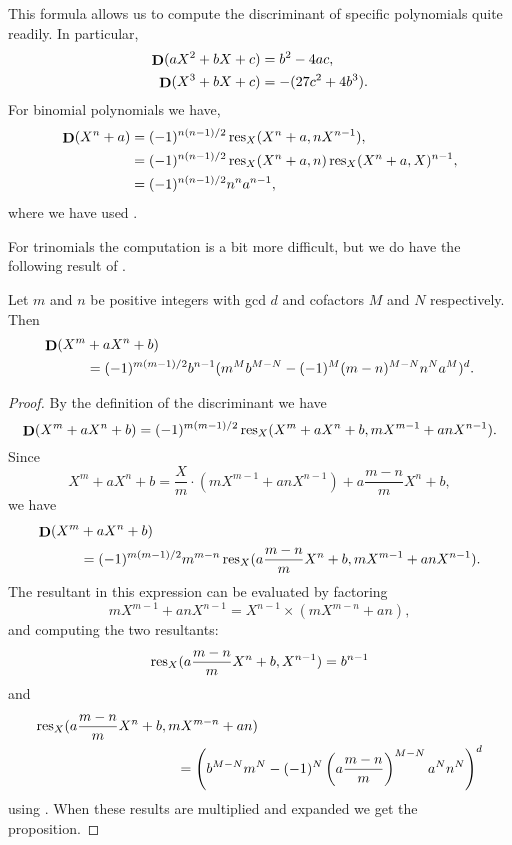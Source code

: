 This formula allows us to compute the discriminant of specific
polynomials quite readily.  In particular,
\[
\begin{aligned}
\mathop{\mathbf{D}}\nolimits(aX^2 + bX + c) & = b^2 - 4ac, \\
\mathop{\mathbf{D}}\nolimits(X^3 + bX + c)  & = -(27 c^2 + 4b^3).
\end{aligned}
\]
For binomial polynomials we have,
\[
\begin{aligned}
\mathop{\mathbf{D}}\nolimits(X^n +a) &= (-1)^{n(n-1)/2} \mathop{\rm res}\nolimits_X(X^n + a, n X^{n-1}), \\
 & = (-1)^{n(n-1)/2} \mathop{\rm res}\nolimits_X(X^n + a, n) \mathop{\rm res}\nolimits_X(X^n + a, X)^{n-1}, \\
 & = (-1)^{n(n-1)/2} n^n a^{n-1},
\end{aligned}
\]
where we have used .

For trinomials the computation is a bit more difficult, but we do have
the following result of {\Swan} \cite{Swan62}.

\begin{proposition}[Swan]
Let $m$ and $n$ be positive integers with {\sc gcd} $d$ and cofactors
$M$ and $N$ respectively.  Then
\[
\begin{aligned}
\mathop{\mathbf{D}}\nolimits(X^m & + aX^n +b)\\
  & =
 (-1)^{m(m-1)/2} b^{n-1} (m^M b^{M - N} - (-1)^M (m - n)^{M - N} n^N a^M)^d.
\end{aligned}
\]
\end{proposition}
\begin{proof}
By the definition of the discriminant we have
\[
\mathop{\mathbf{D}}\nolimits(X^m + aX^n +b) 
    = (-1)^{m(m-1)/2} \mathop{\rm res}\nolimits_X (X^m + aX^n + b, mX^{m-1} + anX^{n-1}).
\]
Since
\[
X^m + a X^n + b = \frac{X}{m} \cdot \left( mX^{m-1} + a n
X^{n-1}\right)
  + a \frac{m - n}{m} X^n + b,
\]
we have
\[
\begin{aligned}
\mathop{\mathbf{D}}\nolimits(X^m &+ aX^n +b) \\
  & = (-1)^{m(m-1)/2}  m^{m-n} \mathop{\rm res}\nolimits_X (a \frac{m - n}{m} X^n + b, mX^{m-1} + anX^{n-1}).
\end{aligned}
\]
The resultant in this expression can be evaluated by factoring
\[
mX^{m-1} + a n X^{n-1} = X^{n-1} \times (m X^{m-n} + a n),
\]
and computing the two resultants:
\[
\mathop{\rm res}\nolimits_X (a \frac{m - n}{m} X^n + b, X^{n-1}) = b^{n-1}
\]
and 
\[
\begin{aligned}
\mathop{\rm res}\nolimits_X &(a \frac{m - n}{m} X^n + b, mX^{m-n} + an)\\
  &\qquad\qquad\qquad\qquad =
\left(b^{M-N} m^N - (-1)^N \left(a \frac{m-n}{m}\right)^{M-N} a^N
n^N\right)^d
\end{aligned}
\]
using .
When these results are multiplied and expanded we get the proposition.
\end{proof}

